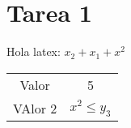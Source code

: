 \documentclass{article}
\begin{document}
\section{Tarea 1}
Hola latex: $x_2 + x_1 + x^2$
\begin{tabular}{|c|c|}
    \hline
    Valor & 5 \\
    VAlor 2 & $x^2 \leq y_3$ \\
    \hline
\end{tabular}
\end{document}
